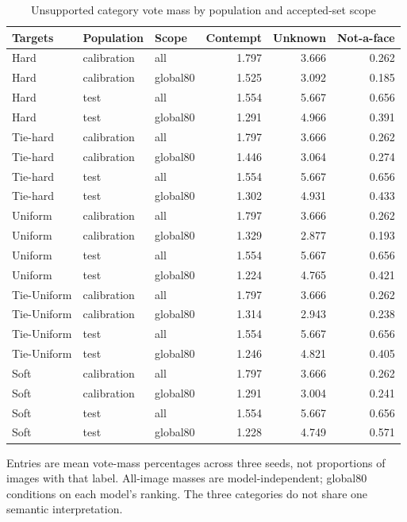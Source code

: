 \documentclass[10pt]{article}
\begin{document}
\clearpage
\begin{longtable}{lllrrr}\caption{Unsupported category vote mass by population and accepted-set scope}\\\toprule Targets & Population & Scope & Contempt & Unknown & Not-a-face\\\midrule\endhead
Hard & calibration & all & 1.797 & 3.666 & 0.262\\
Hard & calibration & global80 & 1.525 & 3.092 & 0.185\\
Hard & test & all & 1.554 & 5.667 & 0.656\\
Hard & test & global80 & 1.291 & 4.966 & 0.391\\
Tie-hard & calibration & all & 1.797 & 3.666 & 0.262\\
Tie-hard & calibration & global80 & 1.446 & 3.064 & 0.274\\
Tie-hard & test & all & 1.554 & 5.667 & 0.656\\
Tie-hard & test & global80 & 1.302 & 4.931 & 0.433\\
Uniform & calibration & all & 1.797 & 3.666 & 0.262\\
Uniform & calibration & global80 & 1.329 & 2.877 & 0.193\\
Uniform & test & all & 1.554 & 5.667 & 0.656\\
Uniform & test & global80 & 1.224 & 4.765 & 0.421\\
Tie-Uniform & calibration & all & 1.797 & 3.666 & 0.262\\
Tie-Uniform & calibration & global80 & 1.314 & 2.943 & 0.238\\
Tie-Uniform & test & all & 1.554 & 5.667 & 0.656\\
Tie-Uniform & test & global80 & 1.246 & 4.821 & 0.405\\
Soft & calibration & all & 1.797 & 3.666 & 0.262\\
Soft & calibration & global80 & 1.291 & 3.004 & 0.241\\
Soft & test & all & 1.554 & 5.667 & 0.656\\
Soft & test & global80 & 1.228 & 4.749 & 0.571\\
\bottomrule\end{longtable}
Entries are mean vote-mass percentages across three seeds, not proportions of images with that label. All-image masses are model-independent; global80 conditions on each model's ranking. The three categories do not share one semantic interpretation.
\end{document}
